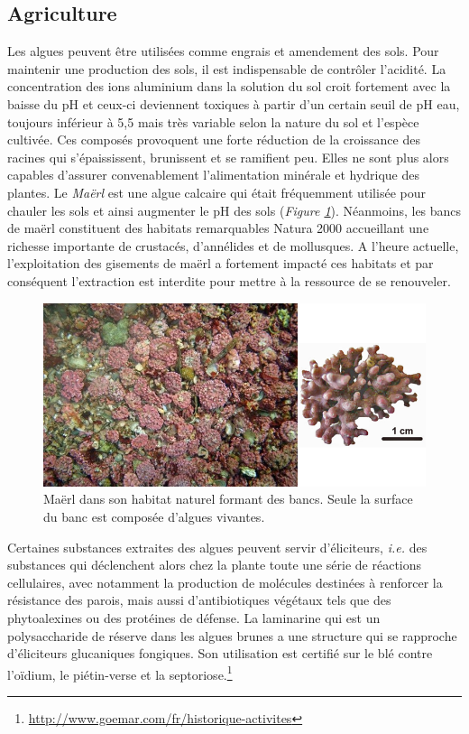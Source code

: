 \documentclass[
]{book}
\begin{document}
\hypertarget{agriculture}{%
\subsection{Agriculture}\label{agriculture}}

Les algues peuvent être utilisées comme engrais et amendement des sols. Pour maintenir une production des sols, il est indispensable de contrôler l'acidité. La concentration des ions aluminium dans la solution du sol croit fortement avec la
baisse du pH et ceux-ci deviennent toxiques à partir d'un certain seuil de pH eau, toujours inférieur à 5,5 mais très variable selon la nature du sol et l'espèce cultivée. Ces composés provoquent une forte réduction de la croissance des racines qui s'épaississent, brunissent et se ramifient peu. Elles ne sont plus alors capables d'assurer convenablement l'alimentation minérale et hydrique des plantes. Le \emph{Maërl} est une algue calcaire qui était fréquemment utilisée pour chauler les sols et ainsi augmenter le pH des sols (\emph{Figure \ref{fig:maerl}}). Néanmoins, les bancs de maërl constituent des habitats remarquables Natura 2000 accueillant une richesse importante de crustacés, d'annélides et de mollusques. A l'heure actuelle, l'exploitation des gisements de maërl a fortement impacté ces habitats et par conséquent l'extraction est interdite pour mettre à la ressource de se renouveler.

\begin{figure}

{\centering \includegraphics[width=10.25in]{images/maerl} 

}

\caption{Maërl dans son habitat naturel formant des bancs. Seule la surface du banc est composée d'algues vivantes.}\label{fig:maerl}
\end{figure}

Certaines substances extraites des algues peuvent servir d'éliciteurs, \emph{i.e.} des substances qui déclenchent alors chez la plante toute une série de réactions cellulaires, avec notamment la production de molécules destinées à renforcer la résistance des parois, mais aussi d'antibiotiques végétaux tels que des phytoalexines ou des protéines de défense.
La laminarine qui est un polysaccharide de réserve dans les algues brunes a une structure qui se rapproche d'éliciteurs glucaniques fongiques. Son utilisation est certifié sur le blé contre l'oïdium, le piétin-verse et la septoriose.\footnote{\url{http://www.goemar.com/fr/historique-activites}}
\end{document}
